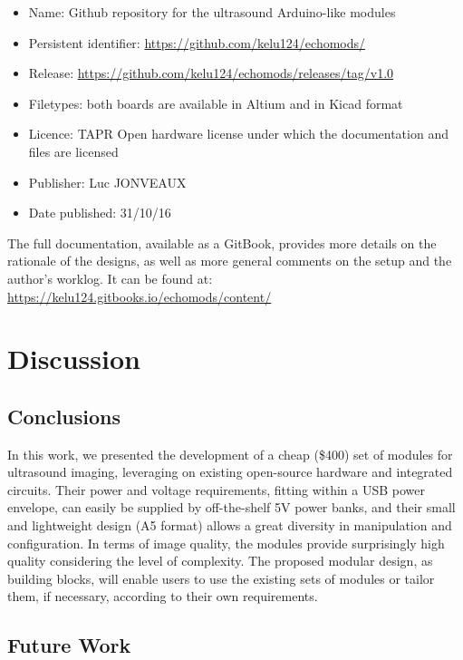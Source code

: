 \documentclass[letterpaper, 10 pt, conference]{ieeeconf} %
\begin{document}
\begin{itemize}
\item Name: Github repository for the ultrasound Arduino-like modules
\item Persistent identifier: \url{https://github.com/kelu124/echomods/}
\item Release: \url{https://github.com/kelu124/echomods/releases/tag/v1.0} 
\item Filetypes: both boards are available in Altium and in Kicad format
\item Licence: TAPR Open hardware license under which the documentation and files are licensed
\item Publisher: Luc JONVEAUX
\item Date published: 31/10/16
\end{itemize}

The full documentation, available as a GitBook, provides more details on the rationale of the designs, as well as more general comments on the setup and the author's worklog. It can be found at: \url{https://kelu124.gitbooks.io/echomods/content/}





\section{Discussion}

\subsection{Conclusions}

In this work, we presented the development of a cheap (\$400) set of modules for ultrasound imaging, leveraging on existing open-source hardware and integrated circuits. Their power and voltage requirements, fitting within a USB power envelope, can easily be supplied by off-the-shelf 5V power banks, and their small and lightweight design (A5 format) allows a great diversity in manipulation and configuration. In terms of image quality, the modules provide surprisingly high quality considering the level of complexity. The proposed modular design, as building blocks, will enable users to use the existing sets of modules or tailor them, if necessary, according to their own requirements.

\subsection{Future Work}
\end{document}
